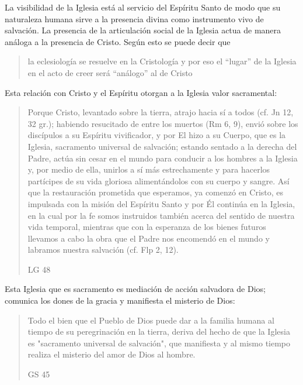 La visibilidad de la Iglesia está al servicio del Espíritu Santo de modo que su
naturaleza humana sirve a la presencia divina como instrumento vivo de
salvación. La presencia de la articulación social de la Iglesia actua de manera
análoga a la presencia de Cristo. Según esto se puede decir que
\blockquote[{\cite[566]{ninot2009tf}}]{la eclesiología se resuelve en la
  Cristología y por eso el \enquote{lugar} de la Iglesia en el acto de creer
  será \enquote{análogo} al de Cristo}. Esta relación con Cristo y el Espíritu
otorgan a la Iglesia valor sacramental:
\blockquote[LG 48]{Porque Cristo, levantado sobre la tierra, atrajo hacia sí a
  todos (cf. Jn 12, 32 gr.); habiendo resucitado de entre los muertos (Rm 6, 9),
  envió sobre los discípulos a su Espíritu vivificador, y por El hizo a su
  Cuerpo, que es la Iglesia, sacramento universal de salvación; estando sentado
  a la derecha del Padre, actúa sin cesar en el mundo para conducir a los
  hombres a la Iglesia y, por medio de ella, unirlos a sí más estrechamente y
  para hacerlos partícipes de su vida gloriosa alimentándolos con su cuerpo y
  sangre. Así que la restauración prometida que esperamos, ya comenzó en Cristo,
  es impulsada con la misión del Espíritu Santo y por Él continúa en la Iglesia,
  en la cual por la fe somos instruidos también acerca del sentido de nuestra
  vida temporal, mientras que con la esperanza de los bienes futuros llevamos a
  cabo la obra que el Padre nos encomendó en el mundo y labramos nuestra
  salvación (cf. Flp 2, 12).}
Esta Iglesia que es sacramento es mediación de acción salvadora de Dios;
comunica los dones de la gracia y manifiesta el misterio de Dios:
\blockquote[GS 45]{Todo el bien que el Pueblo de Dios puede dar a la familia
  humana al tiempo de su peregrinación en la tierra, deriva del hecho de que la
  Iglesia es "sacramento universal de salvación", que manifiesta y al mismo
  tiempo realiza el misterio del amor de Dios al hombre.}

